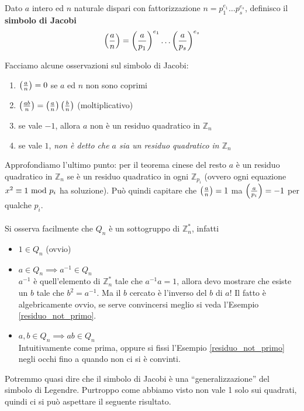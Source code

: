 \begin{definizione}
	Dato $a$ intero ed $n$ naturale dispari con fattorizzazione $n=p_1^{e_1}\dots p_s^{e_s}$, definisco il \textbf{simbolo di Jacobi}
	\begin{equation*}
	\left(\frac{a}{n}\right)=\left(\frac{a}{p_1}\right)^{e_1}\dots\left(\frac{a}{p_s}\right)^{e_s}
	\end{equation*}
\end{definizione}
\begin{osservazione}
	Facciamo alcune osservazioni sul simbolo di Jacobi:
	\begin{enumerate}
		\item $\left(\frac{a}{n}\right)=0$ se $a$ ed $n$ non sono coprimi
		\item $\left(\frac{ab}{n}\right)=\left(\frac{a}{n}\right)\left(\frac{b}{n}\right)$ (moltiplicativo)
		\item se vale $-1$, allora $a$ non è un residuo quadratico in $\mathbb{Z}_n$
		\item se vale $1$, \textit{non è detto che $a$ sia un residuo quadratico in $\mathbb{Z}_n$}
	\end{enumerate}
	Approfondiamo l'ultimo punto: per il teorema cinese del resto $a$ è un residuo quadratico in $\mathbb{Z}_n$ se è un residuo quadratico in ogni $\mathbb{Z}_{p_i}$ (ovvero ogni equazione $x^2\equiv1\ \mathrm{mod}\ p_i$ ha soluzione). Può quindi capitare che $\left(\frac{a}{n}\right)=1$ ma $\left(\frac{a}{p_i}\right)=-1$ per qualche $p_i$. \\ \\ Si osserva facilmente che $Q_n$ è un sottogruppo di $\mathbb{Z}_n^*$, infatti
	\begin{itemize}
		\item $1\in Q_n$ (ovvio)
		\item $a\in Q_n \implies a^{-1}\in Q_n$ \\ $a^{-1}$ è quell'elemento di $\mathbb{Z}_n^*$ tale che $a^{-1}a=1$, allora devo mostrare che esiste un $b$ tale che $b^2=a^{-1}$. Ma il $b$ cercato è l'inverso del $b$ di $a$! Il fatto è algebricamente ovvio, se serve convincersi meglio si veda l'Esempio \ref{residuo_not_primo}.
		\item $a,b\in Q_n \implies ab\in Q_n$ \\ Intuitivamente come prima, oppure si fissi l'Esempio \ref{residuo_not_primo} negli occhi fino a quando non ci si è convinti.
	\end{itemize}
	Potremmo quasi dire che il simbolo di Jacobi è una \enquote{generalizzazione} del simbolo di Legendre. Purtroppo come abbiamo visto non vale 1 solo sui quadrati, quindi ci si può aspettare il seguente risultato.
\end{osservazione}
